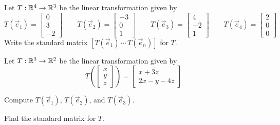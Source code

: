 \begin{activity}{3}
  Let \(T: \mathbb{R}^4 \rightarrow \mathbb{R}^3\) be the linear transformation given by
  \[
    T\left(\vec e_1 \right)
  =
    \begin{bmatrix} 0 \\ 3 \\ -2\end{bmatrix}
  \hspace{2em}
    T\left(\vec e_2 \right)
  =
    \begin{bmatrix} -3 \\ 0 \\ 1\end{bmatrix}
  \hspace{2em}
    T\left(\vec e_3 \right)
  =
    \begin{bmatrix} 4 \\ -2 \\ 1\end{bmatrix}
  \hspace{2em}
    T\left(\vec e_4 \right)
  =
    \begin{bmatrix} 2 \\ 0 \\ 0\end{bmatrix}
  \]
Write the standard matrix \([T(\vec e_1) \,\cdots\, T(\vec e_n)]\) for \(T\).
\end{activity}

\begin{activity}{5}
  Let \(T: \mathbb{R}^3 \rightarrow \mathbb{R}^2\) be the linear transformation given by
\[T\left(\begin{bmatrix} x\\ y \\ z \end{bmatrix} \right) = \begin{bmatrix} x+3z \\ 2x-y-4z \end{bmatrix}\]
\begin{subactivity}
Compute \(T(\vec e_1)\), \(T(\vec e_2)\), and \(T(\vec e_3)\).
\end{subactivity}
\begin{subactivity}
Find the standard matrix for \(T\).
\end{subactivity}
\end{activity}

